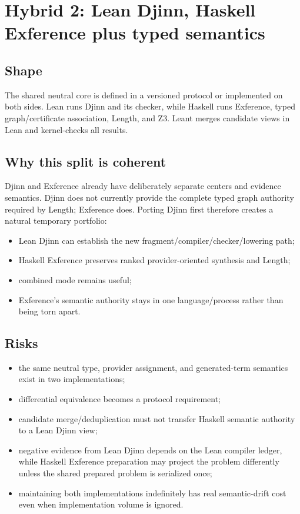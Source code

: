\documentclass[10pt,letterpaper,oneside]{report}
\begin{document}
\section{Hybrid 2: Lean Djinn, Haskell Exference plus typed semantics}

\subsection{Shape}

The shared neutral core is defined in a versioned protocol or implemented on both sides. Lean runs Djinn and its checker, while Haskell runs Exference, typed graph/certificate association, Length, and Z3. Leant merges candidate views in Lean and kernel-checks all results.

\subsection{Why this split is coherent}

Djinn and Exference already have deliberately separate centers and evidence semantics. Djinn does not currently provide the complete typed graph authority required by Length; Exference does. Porting Djinn first therefore creates a natural temporary portfolio:

\begin{itemize}
  \item Lean Djinn can establish the new fragment/compiler/checker/lowering path;
  \item Haskell Exference preserves ranked provider-oriented synthesis and Length;
  \item combined mode remains useful;
  \item Exference's semantic authority stays in one language/process rather than being torn apart.
\end{itemize}

\subsection{Risks}

\begin{itemize}
  \item the same neutral type, provider assignment, and generated-term semantics exist in two implementations;
  \item differential equivalence becomes a protocol requirement;
  \item candidate merge/deduplication must not transfer Haskell semantic authority to a Lean Djinn view;
  \item negative evidence from Lean Djinn depends on the Lean compiler ledger, while Haskell Exference preparation may project the problem differently unless the shared prepared problem is serialized once;
  \item maintaining both implementations indefinitely has real semantic-drift cost even when implementation volume is ignored.
\end{itemize}
\end{document}
